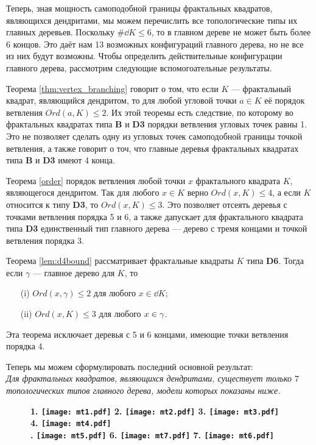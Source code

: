 Теперь, зная мощность самоподобной границы фрактальных квадратов, являющихся дендритами, мы можем перечислить все топологические типы их главных деревьев.
Поскольку $\#\dd K\leq6$, то в главном дереве не может быть более 6 концов.
Это даёт нам 13 возможных конфигураций главного дерева, но не все из них будут возможны.
Чтобы определить действительные конфигурации главного дерева, рассмотрим следующие вспомогоательные результаты.

Теорема \ref{thm:vertex_branching} говорит о том, что если $K$ --- фрактальный квадрат, являющийся дендритом, то для любой угловой точки $a\in K$ её порядок ветвления $Ord(a,K)\leq 2$.
Их этой теоремы есть следствие, по которому во фрактальных квадратах типа {\bf B} и {\bf D3} порядки ветвления угловых точек равны 1.
Это не позволяет сделать одну из угловых точек самоподобной границы точкой ветвления, а также говорит о точ, что главные деревья фрактальных квадратах типа {\bf B} и {\bf D3} имеют 4 конца.

Теорема \ref{order} порядок ветвления любой точки $x$ фрактального квадрата $K$, являющегося дендритом.
Так для любого  $x\in K$ верно $Ord(x,K)\le 4$, а если $K$ относится к типу {\bf D3}, то $Ord(x, K)\le 3$.
Это позволяет отсеять деревья с точками ветвления порядка 5 и 6, а также дапускает для фрактального квадрата типа {\bf D3} единственный тип главного дерева --- дерево с тремя концами и точкой ветвления порядка 3.

Теорема \ref{lem:d4bound} рассматривает фрактальные квадраты $K$ типа {\bf D6}.
Тогда если $\gamma$ ---  главное дерево для $K$, то
\begin{itemize}[nolistsep]
    \item[(i)] $Ord(x,\gamma)\leq2$ для любого $x\in\dd K$;
    \item[(ii)] $Ord(x,K)\leq3$ для любого $x\in\gamma$.
\end{itemize}
Эта теорема исключает деревья с 5 и 6 концами, имеющие точки ветвления порядка 4.

Теперь мы можем сформулировать последний основной результат:\\

{\em Для фрактальных квадратов, являющихся дендритами, существует только $7$ топологических типов главного дерева, модели которых показаны ниже.}
\begin{figure}[H]
    \centering \Large {\bf
    1. \texttt{[image: mt1.pdf]}
    \hfill
    2. \texttt{[image: mt2.pdf]}
    \hfill
    3. \texttt{[image: mt3.pdf]}
    \hfill
    4. \texttt{[image: mt4.pdf]}\\
    . \texttt{[image: mt5.pdf]}
    \hfill
    6. \texttt{[image: mt7.pdf]}
    \hfill
    7. \texttt{[image: mt6.pdf]}}
\end{figure}

